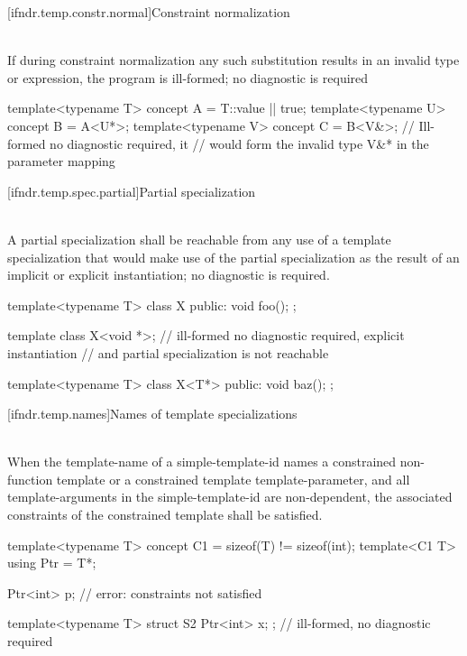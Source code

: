 [ifndr.temp.constr.normal]{Constraint normalization}

\pnum
{} \\
If during constraint normalization any such substitution results in an invalid type or expression,
the program is ill-formed; no diagnostic is required

\pnum
\begin{example}
\begin{codeblock}
template<typename T> concept A = T::value || true;
template<typename U> concept B = A<U*>;
template<typename V> concept C = B<V&>; // Ill-formed no diagnostic required, it
					// would form the invalid type V\&* in the parameter mapping
\end{codeblock}
\end{example}


[ifndr.temp.spec.partial]{Partial specialization}

\pnum
{} \\
A partial specialization shall be reachable from any use of a template specialization that would make use of the
partial specialization as the result of an implicit or explicit instantiation; no diagnostic is required.

\pnum
\begin{example}
\begin{codeblock}
template<typename T> class X{
public:
  void foo(){};
};

template class X<void *>;       // ill-formed no diagnostic required, explicit instantiation
                                // and partial specialization is not reachable

template<typename T> class X<T*>{
public:
  void baz();
};
\end{codeblock}
\end{example}


[ifndr.temp.names]{Names of template specializations}

\pnum
{} \\
When the template-name of a simple-template-id names a constrained non-function template or a constrained
template template-parameter, and all template-arguments in the simple-template-id are non-dependent,
the associated constraints of the constrained template shall be satisfied.

\pnum
\begin{example}
\begin{codeblock}
template<typename T> concept C1 = sizeof(T) != sizeof(int);
template<C1 T> using Ptr = T*;

Ptr<int> p; // error: constraints not satisfied

template<typename T>
struct S2 { Ptr<int> x; };      // ill-formed, no diagnostic required
\end{codeblock}
\end{example}


